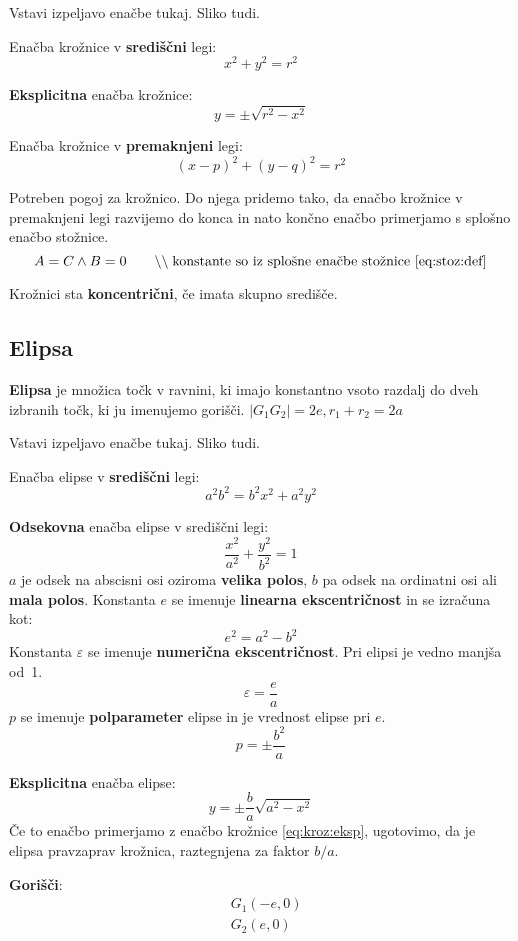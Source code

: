 \documentclass[a4paper,oneside,12pt,fleqn]{article}
\newcommand{\comment}[1]{\ensuremath{\qquad\backslash\backslash\;}\textnormal{#1}}
\numberwithin{equation}{section}
\begin{document}
Vstavi izpeljavo enačbe tukaj. Sliko tudi.

Enačba krožnice v \textbf{središčni} legi:
\[ x^2 + y^2 = r^2 \]

\textbf{Eksplicitna} enačba krožnice:
\begin{equation}
    y = \pm \sqrt{r^2 - x^2}
  \label{eq:kroz:eksp}
\end{equation}

Enačba krožnice v \textbf{premaknjeni} legi:
\[ (x-p)^2 + (y-q)^2 = r^2 \]

Potreben pogoj za krožnico. Do njega pridemo tako, da enačbo krožnice v premaknjeni legi
razvijemo do konca in nato končno enačbo primerjamo s splošno enačbo stožnice.
\[ A = C \land B = 0 \comment{konstante so iz splošne enačbe stožnice \eqref{eq:stoz:def}} \]

Krožnici sta \textbf{koncentrični}, če imata skupno središče.

\subsection{Elipsa}
\label{sec:elips}
\textbf{Elipsa} je množica točk v ravnini, ki imajo konstantno vsoto razdalj do dveh izbranih točk,
ki ju imenujemo gorišči. $|G_1G_2| = 2e, r_1 + r_2 = 2a$

Vstavi izpeljavo enačbe tukaj. Sliko tudi.

Enačba elipse v \textbf{središčni} legi:
\[ a^2b^2 = b^2x^2 + a^2y^2 \]

\textbf{Odsekovna} enačba elipse v središčni legi:
\[ \frac{x^2}{a^2} + \frac{y^2}{b^2} = 1 \]
$a$ je odsek na abscisni osi oziroma \textbf{velika polos}, $b$ pa odsek na ordinatni osi
ali \textbf{mala polos}. Konstanta $e$ se imenuje \textbf{linearna ekscentričnost} in se izračuna kot:
\[ e^2 = a^2 - b^2 \]
Konstanta $\varepsilon$ se imenuje \textbf{numerična ekscentričnost}. Pri elipsi je vedno
manjša od~1.
\[ \varepsilon  = \frac{e}{a} \]
$p$ se imenuje \textbf{polparameter} elipse in je vrednost elipse pri $e$.
\[ p = \pm \frac{b^2}{a} \]

\textbf{Eksplicitna} enačba elipse:
\[ y = \pm \frac{b}{a} \sqrt{a^2 - x^2} \]
Če to enačbo primerjamo z enačbo krožnice \eqref{eq:kroz:eksp}, ugotovimo, da je elipsa
pravzaprav krožnica, raztegnjena za faktor $b/a$.

\textbf{Gorišči}:
\begin{align*}
 &G_1(-e, 0) \\
 &G_2(e, 0)
\end{align*}
\end{document}
